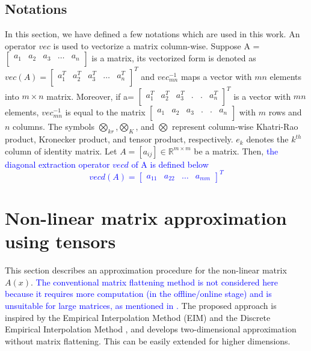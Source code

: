 \documentclass{article}
\begin{document}
\subsection{Notations}
 In this section, we have defined a few notations which are used in this work.
An operator $vec$ is used to vectorize a matrix column-wise. Suppose A = $\begin{bmatrix}
a_1 & a_2 & a_3 &\dots& a_n\\
\end{bmatrix}$ is a  matrix, its vectorized form is denoted as $vec(A) =\begin{bmatrix}
a_1^T & a_2^T & a_3^T &\dots& a_n^T\\
\end{bmatrix}^T$ and $vec_{mn}^{-1}$ maps a vector with $mn$ elements into $m\times n$ matrix. Moreover, if a= $\begin{bmatrix} 
a_1^T & a_2^T & a_3^T &.&.& a_n^T\\
\end{bmatrix}^T$ is a vector with $mn$ elements, $vec_{mn}^{-1}$  is equal to the matrix $\begin{bmatrix}
a_1 & a_2 & a_3 &.&.& a_n\\
\end{bmatrix}$ with $m$ rows and $n$ columns.
The symbols $\bigotimes_{kr}$,$\bigotimes_K$, and $\bigotimes$ represent column-wise Khatri-Rao product, Kronecker product, and tensor product, respectively. $e_k$ denotes the $k^{th}$ column of identity matrix. Let $A=[a_{ij}] \in \mathbb{R}^{m \times m}$ be a matrix. Then, \textcolor{blue}{the diagonal extraction operator $vecd$ of A is defined below
\begin{equation}
    vecd(A)=\begin{bmatrix}
        a_{11} & a_{22} & \dots & a_{mm}
    \end{bmatrix}^T
\end{equation}
}

\section{Non-linear matrix approximation using tensors}

\label{section:sec1}
This section describes an approximation procedure for the non-linear matrix $A(x)$. \textcolor{blue}{The conventional matrix flattening method \cite{wirtz,carlberg2011model} is not considered here because it requires more computation (in the offline/online stage) and is unsuitable for large matrices, as mentioned in \cite{ZHANG2005224}.} The proposed approach is inspired by the Empirical Interpolation Method (EIM) \cite{EIM} and the Discrete Empirical Interpolation Method \cite{DEIM}, and develops two-dimensional approximation without matrix flattening. This can be easily extended for higher dimensions.
\end{document}
